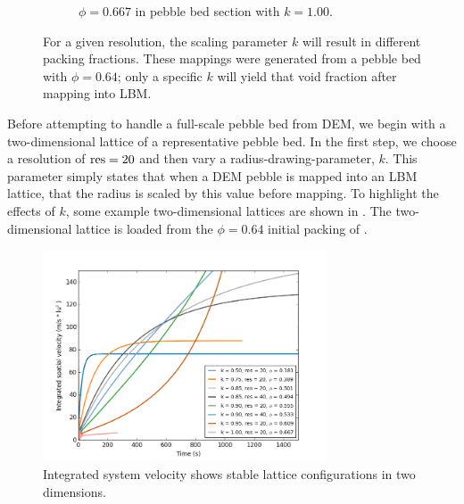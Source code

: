 \begin{figure}[h]
\begin{subfigure}[b]{0.2\textwidth}
                \caption{$\phi = 0.667$ in pebble bed section with $k = 1.00$.}
                \label{fig:2d-res20-k100}
        \end{subfigure}
        \caption{For a given resolution, the scaling parameter $k$ will result in different packing fractions. These mappings were generated from a pebble bed with $\phi =0.64$; only a specific $k$ will yield that void fraction after mapping into LBM.}\label{fig:2d-dem-lbm-mapping}
\end{figure}

Before attempting to handle a full-scale pebble bed from DEM, we begin with a two-dimensional lattice of a representative pebble bed. In the first step, we choose a resolution of $\text{res}=20$ and then vary a radius-drawing-parameter, $k$. This parameter simply states that when a DEM pebble is mapped into an LBM lattice, that the radius is scaled by this value before mapping. To highlight the effects of $k$, some example two-dimensional lattices are shown in . The two-dimensional lattice is loaded from the $\phi =0.64$ initial packing of .

\begin{figure}[h]
    \centering
    \includegraphics[width=0.75\textwidth]{figures/lbm/2d-lbm-settings-velocity}
    \caption{Integrated system velocity shows stable lattice configurations in two dimensions.}\label{fig:2d-lbm-settings-velocity}
\end{figure}

